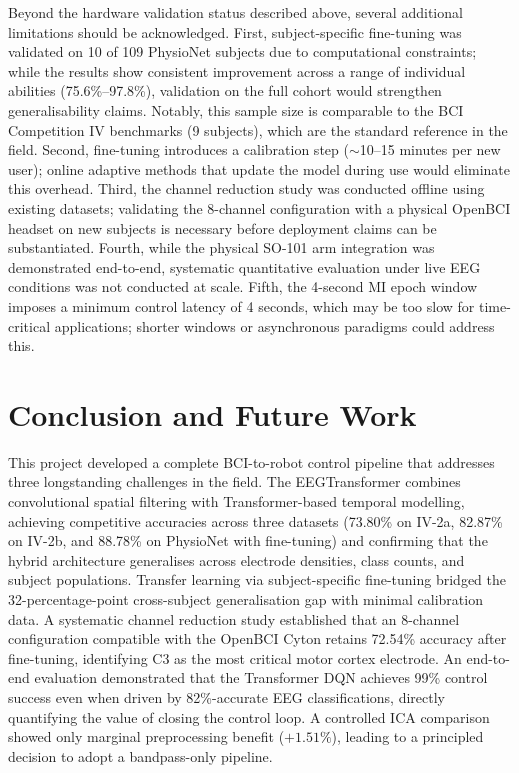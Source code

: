 \documentclass[12pt, a4paper]{article}
\begin{document}
Beyond the hardware validation status described above, several additional limitations should be acknowledged. First, subject-specific fine-tuning was validated on 10 of 109 PhysioNet subjects due to computational constraints; while the results show consistent improvement across a range of individual abilities (75.6\%--97.8\%), validation on the full cohort would strengthen generalisability claims. Notably, this sample size is comparable to the BCI Competition IV benchmarks (9 subjects), which are the standard reference in the field. Second, fine-tuning introduces a calibration step ($\sim$10--15 minutes per new user); online adaptive methods that update the model during use would eliminate this overhead. Third, the channel reduction study was conducted offline using existing datasets; validating the 8-channel configuration with a physical OpenBCI headset on new subjects is necessary before deployment claims can be substantiated. Fourth, while the physical SO-101 arm integration was demonstrated end-to-end, systematic quantitative evaluation under live EEG conditions was not conducted at scale. Fifth, the 4-second MI epoch window imposes a minimum control latency of 4 seconds, which may be too slow for time-critical applications; shorter windows or asynchronous paradigms could address this.

\section{Conclusion and Future Work}

This project developed a complete BCI-to-robot control pipeline that addresses three longstanding challenges in the field. The EEGTransformer combines convolutional spatial filtering with Transformer-based temporal modelling, achieving competitive accuracies across three datasets (73.80\% on IV-2a, 82.87\% on IV-2b, and 88.78\% on PhysioNet with fine-tuning) and confirming that the hybrid architecture generalises across electrode densities, class counts, and subject populations. Transfer learning via subject-specific fine-tuning bridged the 32-percentage-point cross-subject generalisation gap with minimal calibration data. A systematic channel reduction study established that an 8-channel configuration compatible with the OpenBCI Cyton retains 72.54\% accuracy after fine-tuning, identifying C3 as the most critical motor cortex electrode. An end-to-end evaluation demonstrated that the Transformer DQN achieves 99\% control success even when driven by 82\%-accurate EEG classifications, directly quantifying the value of closing the control loop. A controlled ICA comparison showed only marginal preprocessing benefit ($+1.51\%$), leading to a principled decision to adopt a bandpass-only pipeline.
\end{document}
